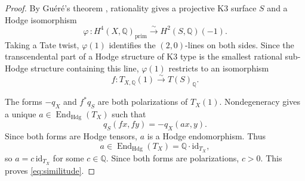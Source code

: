 \documentclass[10pt]{amsart}
\numberwithin{equation}{section}
\theoremstyle{definition}
\theoremstyle{plain}
\numberwithin{theorem}{section}
\newcommand{\Q}{\mathbb{Q}}
\newcommand{\id}{\mathrm{id}}
\newcommand{\End}{\operatorname{End}}
\begin{document}
\begin{proof}
By Gu\'er\'e's theorem \cite[Theorem 56]{guere}, rationality gives a projective K3 surface $S$ and a Hodge isomorphism 
\begin{equation*}
\varphi\,\colon H^4(X,\Q)_{\text{prim}}\xrightarrow{\sim}H^2(S,\Q)(-1).
\end{equation*}
Taking a Tate twist, $\varphi(1)$ identifies the $(2,0)$-lines on both sides. Since the transcendental part of a Hodge structure of K3 type is the smallest rational sub-Hodge structure containing this line, $\varphi(1)$ restricts to an isomorphism
$$
f\colon T_{X,\Q}(1)\xrightarrow{\sim}T(S)_{\Q}.
$$

The forms $-q_X$ and $f^*q_S$ are both polarizations of $T_X(1)$. Nondegeneracy gives a unique $a\in\End_{\mathrm{Hdg}}(T_{X})$ such that
$$
q_S(fx,fy)=-q_X(ax,y).
$$
Since both forms are Hodge tensors, $a$ is a Hodge endomorphism.
Thus
\[
a\in\operatorname{End}_{\mathrm{Hdg}}(T_X)
=\Q\cdot\mathrm{id}_{T_X},
\]
so $a=c\,\mathrm{id}_{T_X}$ for some $c\in\Q$. Since both forms are
polarizations, $c>0$. This proves \eqref{eq:similitude}.
\end{proof}
\end{document}

